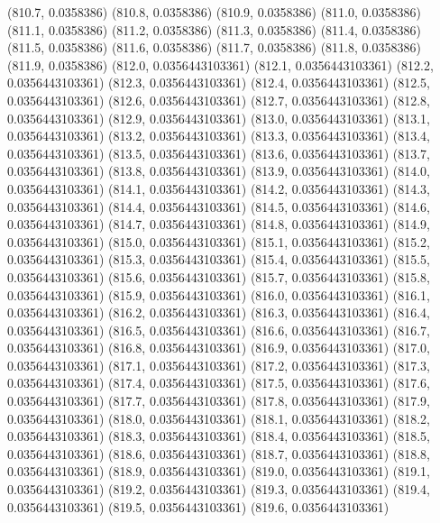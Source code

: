 {					(810.7, 0.0358386)
					(810.8, 0.0358386)
					(810.9, 0.0358386)
					(811.0, 0.0358386)
					(811.1, 0.0358386)
					(811.2, 0.0358386)
					(811.3, 0.0358386)
					(811.4, 0.0358386)
					(811.5, 0.0358386)
					(811.6, 0.0358386)
					(811.7, 0.0358386)
					(811.8, 0.0358386)
					(811.9, 0.0358386)
					(812.0, 0.0356443103361)
					(812.1, 0.0356443103361)
					(812.2, 0.0356443103361)
					(812.3, 0.0356443103361)
					(812.4, 0.0356443103361)
					(812.5, 0.0356443103361)
					(812.6, 0.0356443103361)
					(812.7, 0.0356443103361)
					(812.8, 0.0356443103361)
					(812.9, 0.0356443103361)
					(813.0, 0.0356443103361)
					(813.1, 0.0356443103361)
					(813.2, 0.0356443103361)
					(813.3, 0.0356443103361)
					(813.4, 0.0356443103361)
					(813.5, 0.0356443103361)
					(813.6, 0.0356443103361)
					(813.7, 0.0356443103361)
					(813.8, 0.0356443103361)
					(813.9, 0.0356443103361)
					(814.0, 0.0356443103361)
					(814.1, 0.0356443103361)
					(814.2, 0.0356443103361)
					(814.3, 0.0356443103361)
					(814.4, 0.0356443103361)
					(814.5, 0.0356443103361)
					(814.6, 0.0356443103361)
					(814.7, 0.0356443103361)
					(814.8, 0.0356443103361)
					(814.9, 0.0356443103361)
					(815.0, 0.0356443103361)
					(815.1, 0.0356443103361)
					(815.2, 0.0356443103361)
					(815.3, 0.0356443103361)
					(815.4, 0.0356443103361)
					(815.5, 0.0356443103361)
					(815.6, 0.0356443103361)
					(815.7, 0.0356443103361)
					(815.8, 0.0356443103361)
					(815.9, 0.0356443103361)
					(816.0, 0.0356443103361)
					(816.1, 0.0356443103361)
					(816.2, 0.0356443103361)
					(816.3, 0.0356443103361)
					(816.4, 0.0356443103361)
					(816.5, 0.0356443103361)
					(816.6, 0.0356443103361)
					(816.7, 0.0356443103361)
					(816.8, 0.0356443103361)
					(816.9, 0.0356443103361)
					(817.0, 0.0356443103361)
					(817.1, 0.0356443103361)
					(817.2, 0.0356443103361)
					(817.3, 0.0356443103361)
					(817.4, 0.0356443103361)
					(817.5, 0.0356443103361)
					(817.6, 0.0356443103361)
					(817.7, 0.0356443103361)
					(817.8, 0.0356443103361)
					(817.9, 0.0356443103361)
					(818.0, 0.0356443103361)
					(818.1, 0.0356443103361)
					(818.2, 0.0356443103361)
					(818.3, 0.0356443103361)
					(818.4, 0.0356443103361)
					(818.5, 0.0356443103361)
					(818.6, 0.0356443103361)
					(818.7, 0.0356443103361)
					(818.8, 0.0356443103361)
					(818.9, 0.0356443103361)
					(819.0, 0.0356443103361)
					(819.1, 0.0356443103361)
					(819.2, 0.0356443103361)
					(819.3, 0.0356443103361)
					(819.4, 0.0356443103361)
					(819.5, 0.0356443103361)
					(819.6, 0.0356443103361)
}
